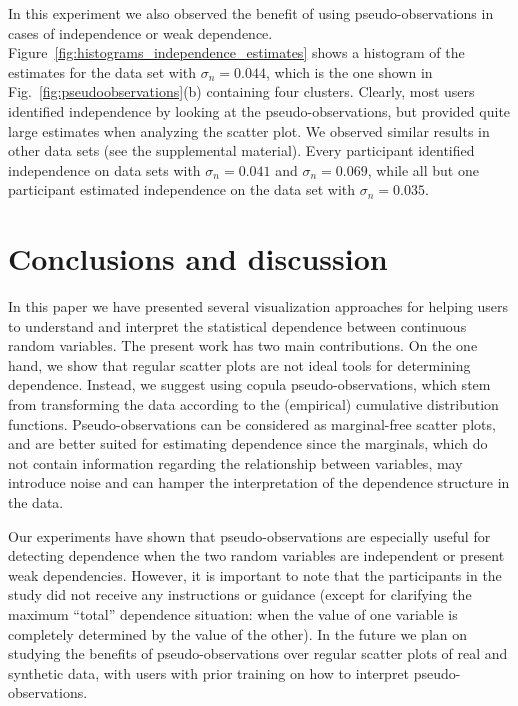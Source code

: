 \documentclass[journal]{vgtc}                %
\begin{document}
In this experiment we also observed the benefit of using pseudo-observations in cases of independence or weak dependence. Figure~\ref{fig:histograms_independence_estimates} shows a histogram of the estimates for the data set with $\sigma_{n} = 0.044$, which is the one shown in Fig.~\ref{fig:pseudoobservations}(b) containing four clusters. Clearly, most users identified independence by looking at the pseudo-observations, but provided quite large estimates when analyzing the scatter plot. We observed similar results in other data sets (see the supplemental material). Every participant identified independence on data sets with $\sigma_{n} = 0.041$ and $\sigma_{n} = 0.069$, while all but one participant estimated independence on the data set with $\sigma_{n} = 0.035$.







\section{Conclusions and discussion}
\label{sec:discussion}

In this paper we have presented several visualization approaches for helping users to understand and interpret the statistical dependence between continuous random variables. The present work has two main contributions. On the one hand, we show that regular scatter plots are not ideal tools for determining dependence. Instead, we suggest using copula pseudo-observations, which stem from transforming the data according to the (empirical) cumulative distribution functions. Pseudo-observations can be considered as marginal-free scatter plots, and are better suited for estimating dependence since the marginals, which do not contain information regarding the relationship between variables, may introduce noise and can hamper the interpretation of the dependence structure in the data.

Our experiments have shown that pseudo-observations are especially useful for detecting dependence when the two random variables are independent or present weak dependencies. However, it is important to note that the participants in the study did not receive any instructions or guidance (except for clarifying the maximum ``total'' dependence situation: when the value of one variable is completely determined by the value of the other). In the future we plan on studying the benefits of pseudo-observations over regular scatter plots of real and synthetic data, with users with prior training on how to interpret pseudo-observations.
\end{document}
